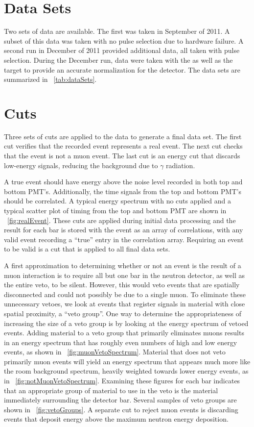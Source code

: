 \section{Data Sets}
Two sets of \reaction data are available.  The first was taken in September of 2011.  A subset of this data was taken with no pulse selection due to hardware failure.  A second run in December of 2011 provided additional data, all taken with pulse selection.  During the December run, data were taken with the \GeTargets as well as the  target to provide an accurate normalization for the detector.  The data sets are summarized in {\tab}~\ref{tab:dataSets}.

\section{Cuts}
Three sets of cuts are applied to the data to generate a final data set.  The first cut verifies that the recorded event represents a real event.  The next cut checks that the event is not a muon event.  The last cut is an energy cut that discards low-energy signals, reducing the background due to $\gamma$ radiation.

A true event should have energy above the noise level recorded in both top and bottom PMT's.  Additionally, the time signals from the top and bottom PMT's should be correlated.  A typical energy spectrum with no cuts applied and a typical scatter plot of timing from the top and bottom PMT are shown in {\fig}~\ref{fig:realEvent}.  These cuts are applied during initial data processing and the result for each bar is stored with the event as an array of correlations, with any valid event recording a ``true'' entry in the correlation array.  Requiring an event to be valid is a cut that is applied to all final data sets.

A first approximation to determining whether or not an event is the result of a muon interaction is to require all but one bar in the neutron detector, as well as the entire veto, to be silent.  However, this would veto events that are spatially disconnected and could not possibly be due to a single muon.  To eliminate these unnecessary vetoes, we look at events that register signals in material with close spatial proximity, a ``veto group''.  One way to determine the appropriateness of increasing the size of a veto group is by looking at the energy spectrum of vetoed events.  Adding material to a veto group that primarily eliminates muons results in an energy spectrum that has roughly even numbers of high and low energy events, as shown in {\fig}~\ref{fig:muonVetoSpectrum}.  Material that does not veto primarily muon events will yield an energy spectrum that appears much more like the room background spectrum, heavily weighted towards lower energy events, as in {\fig}~\ref{fig:notMuonVetoSpectrum}.  Examining these figures for each bar indicates that an appropriate group of material to use in the veto is the material immediately surrounding the detector bar.  Several samples of veto groups are shown in {\fig}~\ref{fig:vetoGroups}.  A separate cut to reject muon events is discarding events that deposit energy above the maximum neutron energy deposition.    

